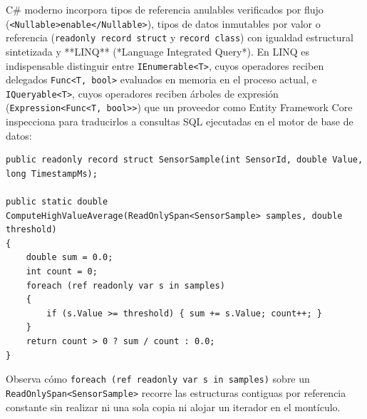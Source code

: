 \documentclass{book}
\begin{document}
C\# moderno incorpora tipos de referencia anulables verificados por flujo (\texttt{<Nullable>enable</Nullable>}), tipos de datos inmutables por valor o referencia (\texttt{readonly record struct} y \texttt{record class}) con igualdad estructural sintetizada y **LINQ** (*Language Integrated Query*). En LINQ es indispensable distinguir entre \texttt{IEnumerable<T>}, cuyos operadores reciben delegados \texttt{Func<T, bool>} evaluados en memoria en el proceso actual, e \texttt{IQueryable<T>}, cuyos operadores reciben árboles de expresión (\texttt{Expression<Func<T, bool>>}) que un proveedor como Entity Framework Core inspecciona para traducirlos a consultas SQL ejecutadas en el motor de base de datos:
\begin{lstlisting}[style=studium]
public readonly record struct SensorSample(int SensorId, double Value, long TimestampMs);

public static double ComputeHighValueAverage(ReadOnlySpan<SensorSample> samples, double threshold)
{
    double sum = 0.0;
    int count = 0;
    foreach (ref readonly var s in samples)
    {
        if (s.Value >= threshold) { sum += s.Value; count++; }
    }
    return count > 0 ? sum / count : 0.0;
}
\end{lstlisting}
Observa cómo \texttt{foreach (ref readonly var s in samples)} sobre un \texttt{ReadOnlySpan<SensorSample>} recorre las estructuras contiguas por referencia constante sin realizar ni una sola copia ni alojar un iterador en el montículo.
\end{document}
